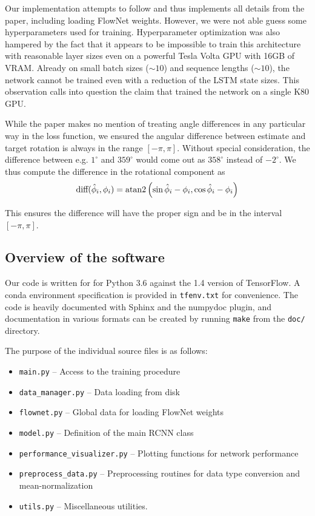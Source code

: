 \documentclass[a4paper,11pt]{article}
\begin{document}
Our implementation attempts to follow \cite{wang2017deepvo} and thus implements
all details from the paper, including loading FlowNet weights.
However, we were not able guess some hyperparameters
used for training. Hyperparameter optimization was also hampered by the fact
that it appears to be impossible to train this architecture with reasonable
layer sizes even on a powerful Tesla Volta GPU with 16GB of VRAM. Already on
small batch sizes ($\sim 10$) and sequence lengths ($\sim 10$), the network cannot be
trained even with a reduction of the LSTM state sizes. This observation calls
into question the claim that \cite{wang2017deepvo} trained the network on a
single K80 GPU.

While the paper makes no mention of treating angle differences in any particular
way in the loss function, we ensured the angular difference between estimate and
target rotation is always in the range $[-\pi,\pi]$. Without special
consideration, the difference between e.g. $1^\circ$ and $359^\circ$ would come out as
$358^\circ$ instead of $-2^\circ$. We thus compute the difference in the rotational
component as
\begin{align}
    \text{diff}(\hat{\phi}_i,\phi_i) = \operatorname{atan2}\left(\sin\hat{\phi}_i - \phi_i,
    \cos{\hat{\phi}_i -\phi_i}\right)
\end{align}

This ensures the difference will have the proper sign and be in the interval
$[-\pi,\pi]$.

\subsection{Overview of the software}
\label{sec:deepvo:software}

Our code is written for for Python 3.6 against the 1.4 version of TensorFlow. A
conda environment specification is provided in \texttt{tfenv.txt} for
convenience. The code is heavily documented with Sphinx and the numpydoc plugin,
and documentation in various formats can be created by running \texttt{make} from the
\texttt{doc/} directory.

The purpose of the individual source files is as follows:
\begin{itemize}
    \item \texttt{main.py} -- Access to the training procedure
    \item \texttt{data\_manager.py} -- Data loading from disk
    \item \texttt{flownet.py} -- Global data for loading FlowNet weights
    \item \texttt{model.py} -- Definition of the main RCNN class
    \item \texttt{performance\_visualizer.py} -- Plotting functions for network performance
    \item \texttt{preprocess\_data.py} -- Preprocessing routines for data type
        conversion and mean-normalization
    \item \texttt{utils.py} -- Miscellaneous utilities.
\end{itemize}
\end{document}

